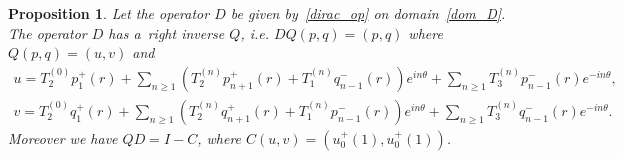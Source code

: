 \documentclass[11pt]{article}
\numberwithin{equation}{section}
\newtheorem{prop}[theo]{Proposition}
{\theoremstyle{definition}
\newtheorem{rem}[theo]{Remark}
\newtheorem{defin}[theo]{Definition}
}
\begin{document}
\begin{prop}
\label{cont_para}
Let the operator $D$ be given by~\eqref{dirac_op} on domain~\eqref{dom_D}.
The operator $D$ has a~right inverse $Q$, i.e.
$DQ(p,q)=(p,q)$ where $Q(p,q)=({u},{v})$ and
\begin{gather*}
{u} = T_2^{(0)}p_1^+(r) + \sum\limits_{n\ge 1}\left(T_2^{(n)}p_{n+1}^+(r) + T_1^{(n)}q_{n-1}^-(r)\right)e^{in\theta} +
\sum\limits_{n\ge1} T_3^{(n)}p_{n-1}^-(r)e^{-in\theta},
\\
{v} = T_2^{(0)}q_1^+(r) + \sum\limits_{n\ge 1}\left(T_2^{(n)}q_{n+1}^+(r) + T_1^{(n)}p_{n-1}^-(r)\right)e^{in\theta} +
\sum\limits_{n\ge1} T_3^{(n)}q_{n-1}^-(r)e^{-in\theta}.
\end{gather*}
Moreover we have $QD= I - C$, where $C(u,v) = \left(u_0^+(1), u_0^+(1)\right)$.
\end{prop}
\end{document}
